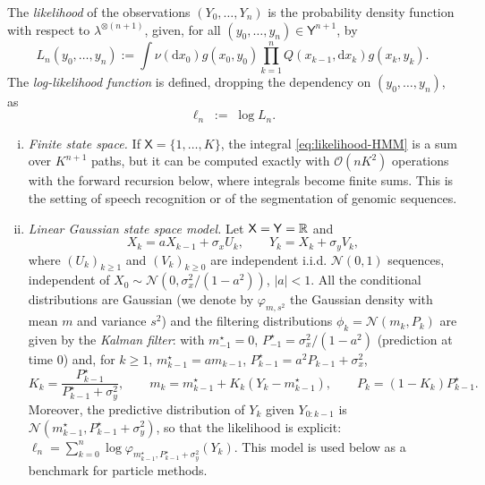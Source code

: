 \documentclass[english,graybox,envcountchap,envcountsame,sectrefs,shortlabels]{svmono}
\theoremstyle{style}
\newcommand{\gauss}{\mathcal{N}}
\newcommand{\eqsp}{}
\begin{document}
\begin{definition}[Likelihood]\label{def:likelihood-HMM}
The \emph{likelihood} of the observations $(Y_0, \dots, Y_n)$ is the
probability density function with respect to $\lambda^{\otimes (n+1)}$, given, for all $ (y_0, \dots, y_n) \in \mathsf{Y}^{n+1}$, by
\begin{equation}\label{eq:likelihood-HMM}
L_{n}(y_0, \dots, y_n) :=
\int \nu(\mathrm{d}x_0) g(x_0, y_0)
\prod_{k=1}^{n} Q(x_{k-1}, \mathrm{d}x_k) g(x_k, y_k)\eqsp.
\end{equation}
The \emph{log-likelihood function} is defined, dropping the dependency on $(y_0, \dots, y_n)$, as
\begin{equation}\label{eq:log-likelihood-HMM}
\ell_{n} \;:=\; \log L_{n}\eqsp.
\end{equation}
\end{definition}

\begin{example}
\label{ex:hmm}
\begin{enumerate}[i)]
\item \emph{Finite state space.} If $\mathsf{X} = \{1,\ldots,K\}$, the integral \eqref{eq:likelihood-HMM} is a sum over $K^{n+1}$ paths, but it can be computed exactly with $\mathcal{O}(nK^2)$ operations with the forward recursion below, where integrals become finite sums. This is the setting of speech recognition or of the segmentation of genomic sequences.
\item \emph{Linear Gaussian state space model.} Let $\mathsf{X} = \mathsf{Y} = \mathbb{R}$ and
$$
X_k = aX_{k-1}+\sigma_xU_k\eqsp,\qquad Y_k = X_k+\sigma_yV_k\eqsp,
$$
where $(U_k)_{k\geq1}$ and $(V_k)_{k\geq0}$ are independent i.i.d. $\gauss(0,1)$ sequences, independent of $X_0\sim\gauss(0,\sigma_x^2/(1-a^2))$, $|a|<1$. All the conditional distributions are Gaussian (we denote by $\varphi_{m,s^2}$ the Gaussian density with mean $m$ and variance $s^2$) and the filtering distributions $\phi_k = \gauss(m_k,P_k)$  are given by the \emph{Kalman filter}: with $m_{-1}^\star = 0$, $P^{\star}_{-1} = \sigma_x^2/(1-a^2)$ (prediction at time $0$) and, for $k\geq1$, $m^\star_{k-1} = am_{k-1}$, $P^\star_{k-1} = a^2P_{k-1}+\sigma_x^2$,
$$
K_k = \frac{P^\star_{k-1}}{P^\star_{k-1}+\sigma_y^2}\eqsp,\qquad m_k = m^\star_{k-1}+K_k(Y_k-m^\star_{k-1})\eqsp,\qquad P_k = (1-K_k)P^\star_{k-1}\eqsp.
$$
Moreover, the predictive distribution of $Y_k$ given $Y_{0:k-1}$ is $\gauss(m^\star_{k-1},P^\star_{k-1}+\sigma_y^2)$, so that the likelihood is explicit: $\ell_n = \sum_{k=0}^n\log\varphi_{m^\star_{k-1},P^\star_{k-1}+\sigma_y^2}(Y_k)$. This model is used below as a benchmark for particle methods.
\end{enumerate}
\end{example}
\end{document}
